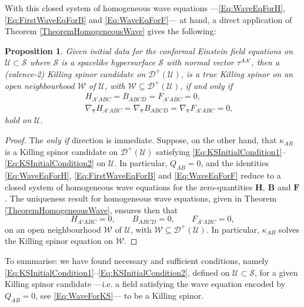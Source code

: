 \documentclass[10pt,a4paper]{article}
\theoremstyle{plain}
\newtheorem{proposition}{Proposition}
\def\bmB{{\bm B}}
\def\bmF{{\bm F}}
\def\bmH{{\bm H}}
\begin{document}
With this closed system of homogeneous
wave equations ---\eqref{Eq:WaveEqForH},
\eqref{Eq:FirstWaveEqForB} and \eqref{Eq:WaveEqForF}--- at hand, a direct application of Theorem
\ref{TheoremHomogeneousWave} gives the following:
\begin{proposition}\label{Prop:Propagation_KS}
  Given initial data for the conformal Einstein field equations on
  $\mathcal{U}\subset\mathcal{S}$ where $\mathcal{S}$ is a spacelike
  hypersurface $\mathcal{S}$ with normal vector $\tau^{AA'}$, then a
  (valence-2) Killing spinor candidate on $\mathcal{D}^{+}(\mathcal{U})$,
  is a true Killing spinor on an open neighbourhood $\mathcal{W}$
  of $\mathcal{U}$, with $\mathcal{W} \subseteq \mathcal{D}^{+}(\mathcal{U})$,
  if and only if
\begin{subequations}
\begin{eqnarray}
  &&
  H_{A'ABC}=B_{ABCD}=F_{A'ABC}=0,\label{Eq:KSInitialCondition1}\\ &&
  \nabla_{\bm\tau} H_{A'ABC}=\nabla_{\bm\tau} B_{ABCD}=
  \nabla_{\bm\tau} F_{A'ABC}=0, \label{Eq:KSInitialCondition2}
\end{eqnarray}
\end{subequations}
hold on $\mathcal{U}$.
\end{proposition}
\begin{proof}
The \emph{only if} direction is immediate. Suppose, on the other hand,
that $\kappa_{AB}$ is a Killing spinor candidate on
$\mathcal{D}^+(\mathcal{U})$ satisfying
\eqref{Eq:KSInitialCondition1}--\eqref{Eq:KSInitialCondition2} on
$\mathcal{U}$. In particular, $Q_{AB}=0$, and the identities
\eqref{Eq:WaveEqForH}, \eqref{Eq:FirstWaveEqForB} and
\eqref{Eq:WaveEqForF} reduce to a closed system of homogeneous wave
equations for the zero-quantities $\bmH,~\bmB$ and
$\bmF$. The uniqueness result for homogeneous wave equations,
given in Theorem \ref{TheoremHomogeneousWave},
ensures then that
\[ H_{A'ABC}=0,\qquad B_{ABCD}=0, \qquad F_{A'ABC}=0,\]
on an open neighbourhood $\mathcal{W}$ of $\mathcal{U}$, with $\mathcal{W}\subseteq
\mathcal{D}^{+}(\mathcal{U})$. In particular,
$\kappa_{AB}$ solves the Killing spinor equation on $\mathcal{W}$.
\end{proof}

To summarise: we have found necessary and sufficient conditions,
namely \eqref{Eq:KSInitialCondition1}--\eqref{Eq:KSInitialCondition2},
defined on $\mathcal{U}\subset \mathcal{S}$, for a given Killing
spinor candidate ---i.e. a field satisfying the wave equation
encoded by $Q_{AB}=0$, see \eqref{Eq:WaveForKS}--- to be a Killing spinor.
\end{document}
